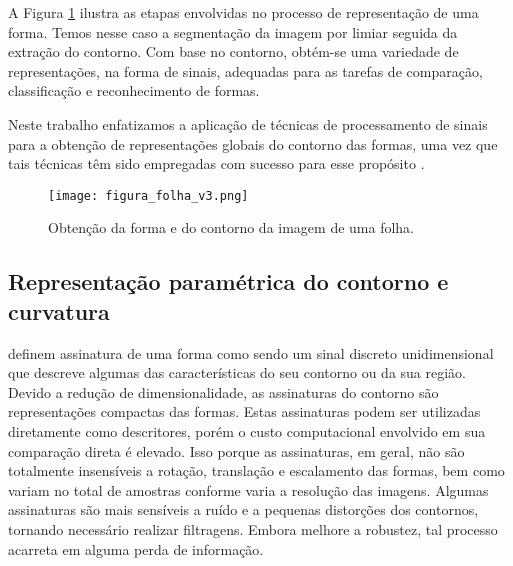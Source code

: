 A Figura \ref{fig:folha_contorno1} ilustra as etapas envolvidas no processo de representação de uma forma. Temos nesse caso a segmentação da imagem por limiar seguida da extração do contorno. Com base no contorno, obtém-se uma variedade de representações, na forma de sinais, adequadas para as tarefas de comparação, classificação e reconhecimento de formas.

Neste trabalho  enfatizamos a aplicação de técnicas de processamento de sinais para a obtenção de representações globais do contorno das formas, uma vez que tais técnicas têm sido empregadas com sucesso para esse propósito \cite{Costa:2009}. 

\begin{comment}
Técnicas baseadas em contorno de formas exploram apenas a região da borda da forma. Há dois tipos de abordagens para extração de características do contorno das formas: global e estrutural. Na abordagem global a forma não é dividida em subpartes e um vetor de características que representa toda a borda é obtido para representar a forma. Na abordagem estrutural a borda da forma é particionada em segmentos, denominados de primitivas mediante algum critério. A representação final é geralmente uma cadeia de caracteres, um grafo ou uma árvore.
\end{comment}



    

\begin{figure} 
\caption{\label{fig:folha_contorno1} Obtenção da forma e do contorno da imagem de uma folha.}
\texttt{[image: figura\_folha\_v3.png]}
\end{figure}

\subsection{\label{sec:Assinatura}Representação paramétrica do contorno e curvatura
}

 definem assinatura de uma forma como sendo um sinal discreto unidimensional que descreve algumas das características do seu contorno ou da sua região. Devido a redução de dimensionalidade, as assinaturas do contorno são representações compactas das formas. Estas assinaturas podem ser utilizadas diretamente como descritores, porém o custo computacional envolvido em sua comparação direta é elevado. Isso porque as assinaturas, em geral, não são totalmente insensíveis a rotação, translação e escalamento das formas, bem como variam no total de amostras conforme varia a resolução das imagens. Algumas assinaturas são mais sensíveis a ruído e a pequenas distorções dos contornos, tornando necessário realizar filtragens. Embora melhore a robustez, tal processo acarreta em alguma perda de informação.

